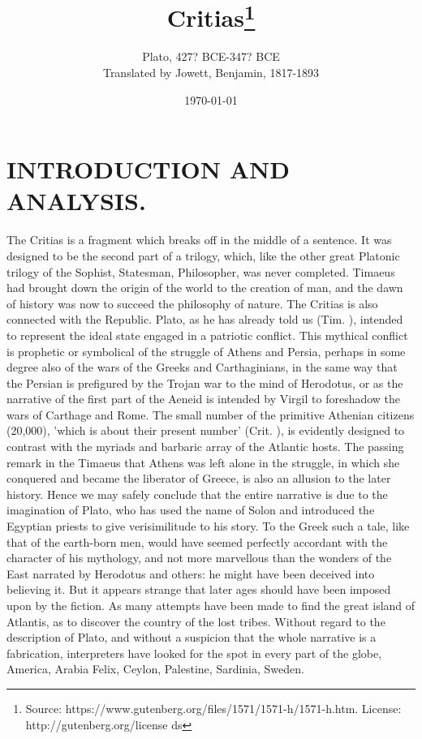 \documentclass[11pt,letter]{article}
\begin{document}
\title{Critias\thanks{Source: https://www.gutenberg.org/files/1571/1571-h/1571-h.htm. License: http://gutenberg.org/license ds}}
\date{\today}
\author{Plato, 427? BCE-347? BCE\\ Translated by Jowett, Benjamin, 1817-1893}
\maketitle

\setcounter{tocdepth}{1}
\tableofcontents
\renewcommand{\baselinestretch}{1.0}
\normalsize
\newpage

\section{
      INTRODUCTION AND ANALYSIS.
    }
\par  The Critias is a fragment which breaks off in the middle of a sentence. It was designed to be the second part of a trilogy, which, like the other great Platonic trilogy of the Sophist, Statesman, Philosopher, was never completed. Timaeus had brought down the origin of the world to the creation of man, and the dawn of history was now to succeed the philosophy of nature. The Critias is also connected with the Republic. Plato, as he has already told us (Tim. ), intended to represent the ideal state engaged in a patriotic conflict. This mythical conflict is prophetic or symbolical of the struggle of Athens and Persia, perhaps in some degree also of the wars of the Greeks and Carthaginians, in the same way that the Persian is prefigured by the Trojan war to the mind of Herodotus, or as the narrative of the first part of the Aeneid is intended by Virgil to foreshadow the wars of Carthage and Rome. The small number of the primitive Athenian citizens (20,000), 'which is about their present number' (Crit. ), is evidently designed to contrast with the myriads and barbaric array of the Atlantic hosts. The passing remark in the Timaeus that Athens was left alone in the struggle, in which she conquered and became the liberator of Greece, is also an allusion to the later history. Hence we may safely conclude that the entire narrative is due to the imagination of Plato, who has used the name of Solon and introduced the Egyptian priests to give verisimilitude to his story. To the Greek such a tale, like that of the earth-born men, would have seemed perfectly accordant with the character of his mythology, and not more marvellous than the wonders of the East narrated by Herodotus and others: he might have been deceived into believing it. But it appears strange that later ages should have been imposed upon by the fiction. As many attempts have been made to find the great island of Atlantis, as to discover the country of the lost tribes. Without regard to the description of Plato, and without a suspicion that the whole narrative is a fabrication, interpreters have looked for the spot in every part of the globe, America, Arabia Felix, Ceylon, Palestine, Sardinia, Sweden.
\end{document}
